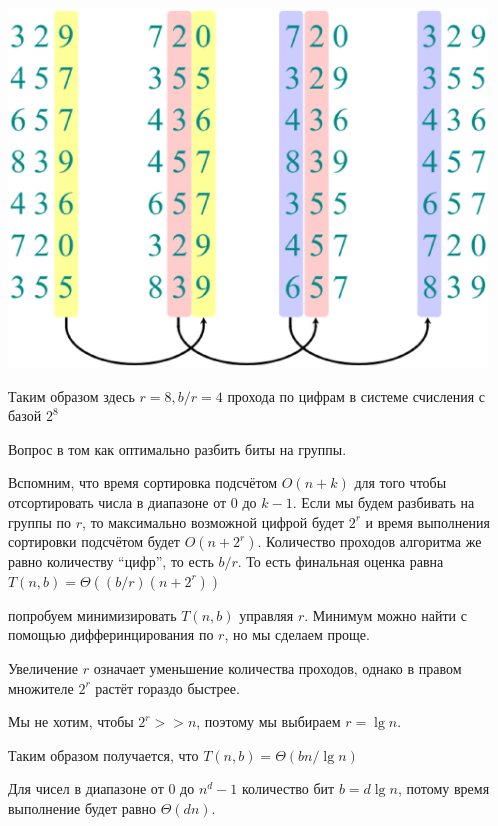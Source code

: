 \documentclass[a4paper,11pt]{article}
\begin{document}
\includegraphics[width=5in]{lecture5/radix-example.eps}

Таким образом здесь $r=8, b/r=4$ прохода по цифрам в системе счисления с базой
$2^8$

Вопрос в том как оптимально разбить биты на группы.

Вспомним, что время сортировка подсчётом $O(n+k)$ для того чтобы отсортировать
числа в диапазоне от 0 до $k-1$. Если мы будем разбивать на группы по $r$, то
максимально возможной цифрой будет $2^r$ и время выполнения сортировки подсчётом
будет $O(n + 2^r)$. Количество проходов алгоритма же равно количеству ``цифр'',
то есть $b/r$. То есть финальная оценка равна $T(n,b) = \Theta((b/r)(n+2^r))$

попробуем минимизировать $T(n,b)$ управляя $r$. Минимум можно найти с помощью
дифферинцирования по $r$, но мы сделаем проще.

Увеличение $r$ означает уменьшение количества проходов, однако в правом
множителе $2^r$ растёт гораздо быстрее.

Мы не хотим, чтобы $2^r >> n$, поэтому мы выбираем $r = \lg n$.

Таким образом получается, что $T(n, b) = \Theta(bn/\lg n)$

Для чисел в диапазоне от 0 до $n^d - 1$ количество бит $b = d \lg n$, потому
время выполнение будет равно $\Theta(dn)$.
\end{document}
